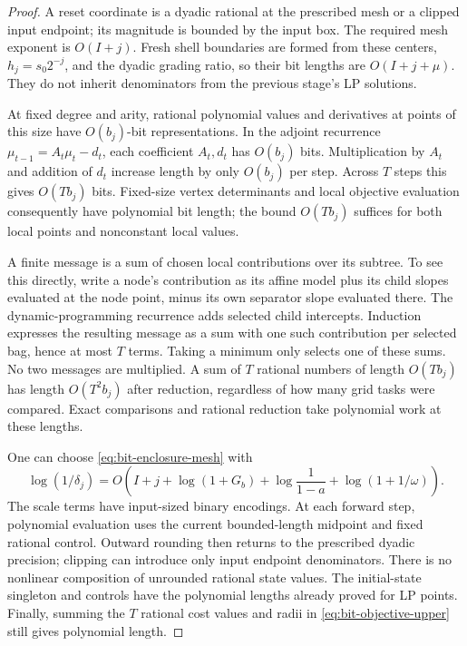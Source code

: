 \begin{proof}
A reset coordinate is a dyadic rational at the prescribed mesh or a clipped
input endpoint; its magnitude is bounded by the input box.  The required
mesh exponent is $O(I+j)$.  Fresh shell boundaries are formed from these
centers, $h_j=s_0 2^{-j}$, and the dyadic grading ratio, so their bit
lengths are $O(I+j+\mu)$.  They do not inherit denominators from the
previous stage's LP solutions.

At fixed degree and arity, rational polynomial values and derivatives at
points of this size have $O(b_j)$-bit representations.  In the adjoint
recurrence
$\mu_{t-1}=A_t\mu_t-d_t$, each coefficient $A_t,d_t$ has $O(b_j)$
bits.  Multiplication by $A_t$ and addition of $d_t$ increase length by
only $O(b_j)$ per step.  Across $T$ steps this gives $O(Tb_j)$ bits.
Fixed-size vertex determinants and local objective evaluation consequently
have polynomial bit length; the bound $O(Tb_j)$ suffices for both local
points and nonconstant local values.

A finite message is a sum of chosen local contributions over its subtree.
To see this directly, write a node's contribution as its affine model plus
its child slopes evaluated at the node point, minus its own separator
slope evaluated there.  The dynamic-programming recurrence adds selected
child intercepts.  Induction expresses the resulting message as a sum
with one such contribution per selected bag, hence at most $T$ terms.
Taking a minimum only selects one of these sums.  No two messages are
multiplied.  A sum of $T$ rational numbers of length $O(Tb_j)$ has length
$O(T^2b_j)$ after reduction, regardless of how many grid tasks were
compared.  Exact comparisons and rational reduction take polynomial work
at these lengths.

One can choose \cref{eq:bit-enclosure-mesh} with
\[
 \log(1/\delta_j)=
 O\left(I+j+\log(1+G_b)+\log\frac1{1-a}
                         +\log(1+1/\omega)\right).
\]
The scale terms have input-sized binary encodings.  At each forward step,
polynomial evaluation uses the current bounded-length midpoint and fixed
rational control.  Outward rounding then returns to the prescribed dyadic
precision; clipping can introduce only input endpoint denominators.
There is no nonlinear composition of unrounded rational state values.
The initial-state singleton and controls have the polynomial lengths
already proved for LP points.  Finally, summing the $T$ rational cost
values and radii in \cref{eq:bit-objective-upper} still gives polynomial
length.
\end{proof}

